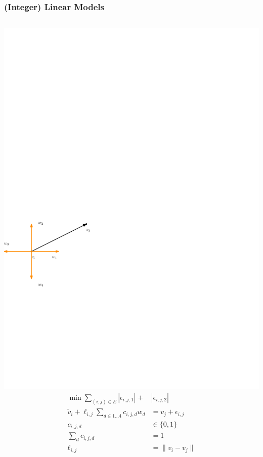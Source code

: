 \documentclass{beamer}
\begin{document}
\begin{frame}
  \frametitle{(Integer) Linear Models}
  \begin{columns}
    \includegraphics[width=\columnwidth]{snapping.pdf}
    \begin{align*}
      \min \sum_{(i,j) \in E} |\epsilon_{i,j,1}| +& |\epsilon_{i,j,2}| \\
      \tilde{v}_i + \ell_{i,j}\sum_{d\in 1\dots 4}c_{i,j,d}w_d &= v_j+\epsilon_{i,j}\\
      c_{i,j,d} &\in \{0, 1\}\\
      \sum_{d} c_{i,j,d} &= 1\\
      \ell_{i,j} &= \| v_i - v_j\|
    \end{align*}
  \end{columns}

\end{frame}
\end{document}
